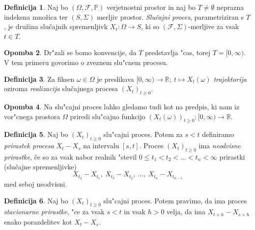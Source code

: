 \documentclass[12pt,a4paper]{amsart}
\theoremstyle{definition} %
\newtheorem{definicija}{Definicija}[section]
\newtheorem{opomba}[definicija]{Opomba}
\theoremstyle{plain} %
\newcommand{\1}{\mathds{1}}
\begin{document}
    \begin{definicija}
        Naj bo $(\Omega, \mathcal{F}, \mathbb{P})$ verjetnostni prostor in naj bo $T\neq\emptyset$
        neprazna indeksna množica ter $(S, \Sigma)$ merljiv prostor. \textit{Slučajni proces}, 
        parametriziran s $T$, je družina slučajnih spremenljivk $X_t : \Omega \to S$,
         ki so $(\mathcal{F}, \Sigma)$-merljive za vsak $t \in T$.
    \end{definicija}

    \begin{opomba}
        Dr"zali se bomo konvencije, da $T$ predstavlja "cas, torej $T = [0, \infty)$.
        V tem primeru govorimo o zveznem slu"cnem procesu.
    \end{opomba}

    \begin{definicija}
        Za fiksen $\omega \in \Omega$ je preslikava 
        $[0, \infty) \rightarrow \mathbb{R}; \ t \mapsto X_t(\omega)$ 
        \textit{trajektorija} oziroma \textit{realizacija} slučajnega procesa $(X_t)_{t\geq0}$.
    \end{definicija}

    \begin{opomba}
        Na slu"cajni proces lahko gledamo tudi kot na predpis, ki nam iz vor"cnega prostora 
        $\Omega$ priredi slu"cajno funkcijo
        $(X_t(\omega))_{t\geq0}: [0, \infty) \rightarrow \mathbb{R}$.
    \end{opomba}

    \begin{definicija}
        Naj bo $(X_t)_{t\geq0}$ slu"cajni proces. Potem za $s < t$ definiramo
        \textit{prirastek procesa} $X_t - X_s$ na intervalu $[s, t]$. Proces $(X_t)_{t\geq0}$ ima 
        \textit{neodvisne prirastke}, če so za vsak nabor realnih "stevil
        $0 \leq t_1 < t_2 < \ldots < t_n < \infty$ prirastki (slučajne spremenljivke)
        $$
            X_{t_2} - X_{t_1}, \ X_{t_3} - X_{t_2}, \ \ldots, \ X_{t_n} - X_{t_{n-1}}
        $$
        med seboj neodvisni.
    \end{definicija}

    \begin{definicija}
        Naj bo $(X_t)_{t\geq0}$ slu"cajni proces. Potem pravimo, da ima proces
        \textit{stacionarne prirastke}, "ce za vsak $s < t$ in vsak $h > 0$ velja, 
        da ima $X_{t+h} - X_{s+h}$ enako porazdelitev kot $X_t - X_s$.
    \end{definicija}
\end{document}
